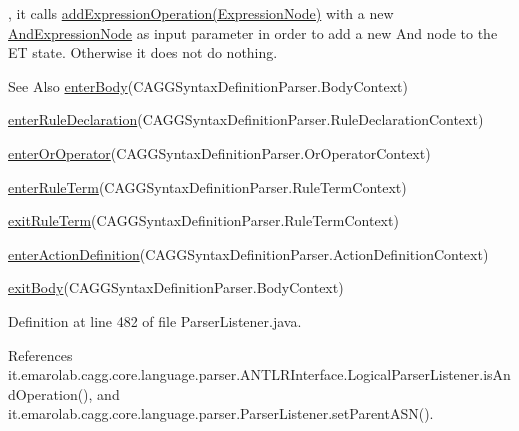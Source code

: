  , it calls \hyperlink{}{add\-Expression\-Operation(\-Expression\-Node)} with a new \hyperlink{}{And\-Expression\-Node} as input parameter in order to add a new And node to the E\-T state. Otherwise it does not do nothing. \begin{DoxySeeAlso}{See Also}
\hyperlink{classit_1_1emarolab_1_1cagg_1_1core_1_1language_1_1parser_1_1ParserListener_a9675dd98156b94a9e26cea3946eaa69d}{enter\-Body}(C\-A\-G\-G\-Syntax\-Definition\-Parser.\-Body\-Context) 

\hyperlink{classit_1_1emarolab_1_1cagg_1_1core_1_1language_1_1parser_1_1ParserListener_a23734ed11648eae22a037a43e8c2d007}{enter\-Rule\-Declaration}(C\-A\-G\-G\-Syntax\-Definition\-Parser.\-Rule\-Declaration\-Context) 

\hyperlink{classit_1_1emarolab_1_1cagg_1_1core_1_1language_1_1parser_1_1ParserListener_a0c20b78d0166b7fe8cf816764d9c7c86}{enter\-Or\-Operator}(C\-A\-G\-G\-Syntax\-Definition\-Parser.\-Or\-Operator\-Context) 

\hyperlink{classit_1_1emarolab_1_1cagg_1_1core_1_1language_1_1parser_1_1ParserListener_ab55244dd0bc74c42338389ef4f186963}{enter\-Rule\-Term}(C\-A\-G\-G\-Syntax\-Definition\-Parser.\-Rule\-Term\-Context) 

\hyperlink{classit_1_1emarolab_1_1cagg_1_1core_1_1language_1_1parser_1_1ParserListener_a9cddde49b7fd2142b1fcd72b5d6e2c51}{exit\-Rule\-Term}(C\-A\-G\-G\-Syntax\-Definition\-Parser.\-Rule\-Term\-Context) 

\hyperlink{classit_1_1emarolab_1_1cagg_1_1core_1_1language_1_1parser_1_1ParserListener_a95c6463441d582fef5d63aea4eb13f56}{enter\-Action\-Definition}(C\-A\-G\-G\-Syntax\-Definition\-Parser.\-Action\-Definition\-Context) 

\hyperlink{classit_1_1emarolab_1_1cagg_1_1core_1_1language_1_1parser_1_1ParserListener_a4ddc07fbccb866fee058db32839fba42}{exit\-Body}(C\-A\-G\-G\-Syntax\-Definition\-Parser.\-Body\-Context) 
\end{DoxySeeAlso}


Definition at line 482 of file Parser\-Listener.\-java.



References it.\-emarolab.\-cagg.\-core.\-language.\-parser.\-A\-N\-T\-L\-R\-Interface.\-Logical\-Parser\-Listener.\-is\-And\-Operation(), and it.\-emarolab.\-cagg.\-core.\-language.\-parser.\-Parser\-Listener.\-set\-Parent\-A\-S\-N().



